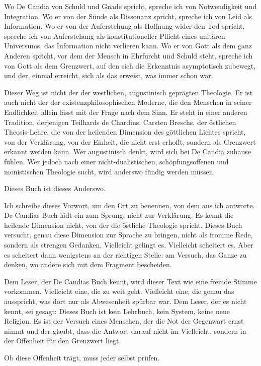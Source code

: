 \documentclass[
  ngerman,
]{article}
\begin{document}
Wo De Candia von Schuld und Gnade spricht, spreche ich von Notwendigkeit
und Integration. Wo er von der Sünde als Dissonanz spricht, spreche ich
von Leid als Information. Wo er von der Auferstehung als Hoffnung wider
den Tod spricht, spreche ich von Auferstehung als konstitutioneller
Pflicht eines unitären Universums, das Information nicht verlieren kann.
Wo er von Gott als dem ganz Anderen spricht, vor dem der Mensch in
Ehrfurcht und Schuld steht, spreche ich von Gott als dem Grenzwert, auf
den sich die Erkenntnis asymptotisch zubewegt, und der, einmal
erreicht, sich als das erweist, was immer schon war.

Dieser Weg ist nicht der der westlichen, augustinisch geprägten
Theologie. Er ist auch nicht der der existenzphilosophischen Moderne,
die den Menschen in seiner Endlichkeit allein lässt mit der Frage nach
dem Sinn. Er steht in einer anderen Tradition, derjenigen Teilhards de
Chardins, Carsten Breschs, der östlichen Theosis-Lehre, die von der
heilenden Dimension des göttlichen Lichtes spricht, von der Verklärung,
von der Einheit, die nicht erst erhofft, sondern als Grenzwert erkannt
werden kann. Wer augustinisch denkt, wird sich bei De Candia zuhause
fühlen. Wer jedoch nach einer nicht-dualistischen, schöpfungsoffenen und
monistischen Theologie sucht, wird anderswo fündig werden müssen.

Dieses Buch ist dieses Anderswo.

Ich schreibe dieses Vorwort, um den Ort zu benennen, von dem aus ich
antworte. De Candias Buch lädt ein zum Sprung, nicht zur Verklärung. Es
kennt die heilende Dimension nicht, von der die östliche Theologie
spricht. Dieses Buch versucht, genau diese Dimension zur Sprache zu
bringen, nicht als fromme Rede, sondern als strengen Gedanken.
Vielleicht gelingt es. Vielleicht scheitert es. Aber es scheitert dann
wenigstens an der richtigen Stelle: am Versuch, das Ganze zu denken, wo
andere sich mit dem Fragment bescheiden.

Dem Leser, der De Candias Buch kennt, wird dieser Text wie eine fremde
Stimme vorkommen. Vielleicht eine, die zu weit geht. Vielleicht eine,
die genau das ausspricht, was dort nur als Abwesenheit spürbar war. Dem
Leser, der es nicht kennt, sei gesagt: Dieses Buch ist kein Lehrbuch,
kein System, keine neue Religion. Es ist der Versuch eines Menschen, der
die Not der Gegenwart ernst nimmt und der glaubt, dass die Antwort
darauf nicht im Vielleicht, sondern in der Offenheit für den Grenzwert
liegt.

Ob diese Offenheit trägt, muss jeder selbst prüfen.
\end{document}
